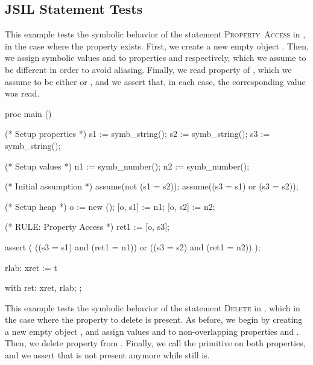 \subsection{JSIL Statement Tests}

This example tests the symbolic behavior of the \jsil statement \mbox{\textsc{Property Access}} in \cosette, in the case where the property exists.
First, we create a new empty object .
Then, we assign symbolic values  and  to properties  and  respectively, which we assume to be different in order to avoid aliasing.
Finally, we read property  of , which we assume to be either  or , and we assert that, in each case, the corresponding value was read.

\begin{lstjshere}
proc main () {
    (* Setup properties *)
    s1 := symb_string();
    s2 := symb_string();
    s3 := symb_string();

    (* Setup values *)
    n1 := symb_number();
    n2 := symb_number();

    (* Initial assumption *)
    assume(not (s1 = s2));
    assume((s3 = s1) or (s3 = s2));

    (* Setup heap *)
    o := new ();
    [o, s1] := n1;
    [o, s2] := n2;

    (* RULE: Property Access *)
    ret1 := [o, s3];

    assert (
        ((s3 = s1) and (ret1 = n1)) or 
        ((s3 = s2) and (ret1 = n2))
    );

    rlab:    xret := $$t
}
with
{
    ret:    xret, rlab;
};
\end{lstjshere}


This example tests the symbolic behavior of the \jsil statement \textsc{Delete} in \cosette, which in the case where the property to delete is present.
As before, we begin by creating a new empty object , and assign values  and  to non-overlapping properties  and .
Then, we delete property  from .
Finally, we call the  primitive on both properties, and we assert that  is not present anymore while  still is.

